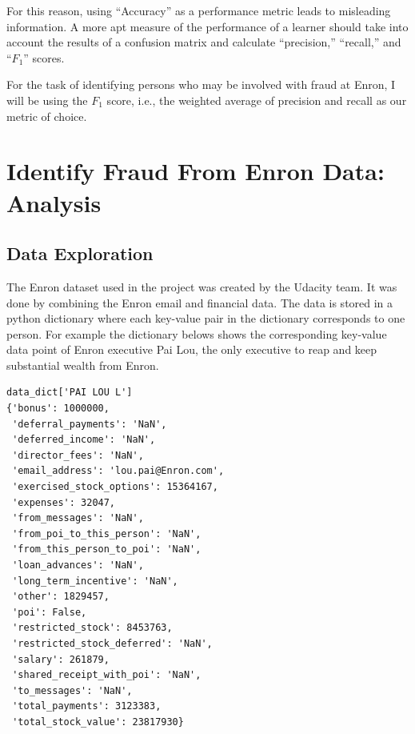 \documentclass[titlepage,numbers=noenddot,headinclude,%
               footinclude=true,abstractoff,BCOR=5mm,%
               paper=a4,fontsize=11pt,ngerman,american]{scrreprt}
\numberwithin{theorem}{chapter}
\numberwithin{definition}{chapter}
\numberwithin{algorithm}{chapter}
\numberwithin{figure}{chapter}
\numberwithin{table}{chapter}
\numberwithin{equation}{chapter}
\begin{document}
For this reason, using ``Accuracy'' as a performance metric leads to misleading information. A more apt measure of the performance of a learner should take into account the results of a confusion matrix and  calculate ``precision,'' ``recall,'' and ``$F_1$'' scores.

For the task of identifying persons who may be involved with fraud at Enron, I will be using the $F_1$ score, i.e., the weighted average of precision and recall as our metric of choice.



\chapter*{Identify Fraud From Enron Data: Analysis}

\section*{Data Exploration}

The Enron dataset used in the project was created by the Udacity team. It was done by combining the Enron email and financial data. The data is stored in a python dictionary where each key-value pair in the dictionary corresponds to one person. For example the dictionary belows shows the corresponding key-value data point of Enron executive Pai Lou, the only executive to reap and keep substantial wealth from Enron.

\begin{verbatim}
data_dict['PAI LOU L']
{'bonus': 1000000,
 'deferral_payments': 'NaN',
 'deferred_income': 'NaN',
 'director_fees': 'NaN',
 'email_address': 'lou.pai@Enron.com',
 'exercised_stock_options': 15364167,
 'expenses': 32047,
 'from_messages': 'NaN',
 'from_poi_to_this_person': 'NaN',
 'from_this_person_to_poi': 'NaN',
 'loan_advances': 'NaN',
 'long_term_incentive': 'NaN',
 'other': 1829457,
 'poi': False,
 'restricted_stock': 8453763,
 'restricted_stock_deferred': 'NaN',
 'salary': 261879,
 'shared_receipt_with_poi': 'NaN',
 'to_messages': 'NaN',
 'total_payments': 3123383,
 'total_stock_value': 23817930}
\end{verbatim}
\end{document}
